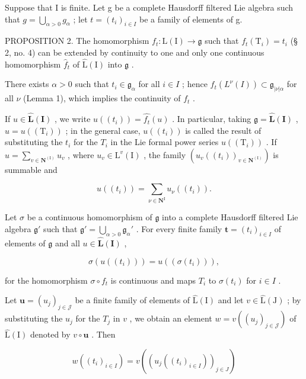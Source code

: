 Suppose that I is finite. Let g be a complete Hausdorff filtered Lie algebra such that \(g = \bigcup_{\alpha > 0} g_{\alpha}\) ; let \(t = (t_i)_{i \in I}\) be a family of elements of g.

PROPOSITION 2. The homomorphism \(f_{t} \colon \mathrm{L}(\mathrm{I}) \to \mathfrak{g}\) such that \(f_{t}(\mathrm{T}_{i}) = t_{i}\) (§ 2, no. 4) can be extended by continuity to one and only one continuous homomorphism \(\hat{f}_{t}\) of \(\hat{\mathrm{L}}(\mathrm{I})\) into \(\mathfrak{g}\) .

There exists \(\alpha > 0\) such that \(t_i \in \mathfrak{g}_\alpha\) for all \(i \in I\) ; hence \(f_t(L^\nu(I)) \subset \mathfrak{g}_{|\nu| \alpha}\) for all \(\nu\) (Lemma 1), which implies the continuity of \(f_t\) .

If \(u \in \widehat{\mathbf{L}}(\mathbf{I})\) , we write \(u((t_i)) = \widehat{f_t}(u)\) . In particular, taking \(\mathfrak{g} = \widehat{\mathbf{L}}(\mathbf{I})\) , \(u = u((\mathrm{T}_i))\) ; in the general case, \(u((t_i))\) is called the result of substituting the \(t_i\) for the \(T_i\) in the Lie formal power series \(u((\mathrm{T}_i))\) . If \(u = \sum_{v \in \mathbf{N}^{(\mathrm{I})}} u_v\) , where \(u_v \in \mathrm{L}^v(\mathrm{I})\) , the family \((u_v((t_i))_{v \in \mathbf{N}^{(\mathrm{I})}})\) is summable and

\[
u ((t _ {i})) = \sum_ {\nu \in \mathbf {N} ^ {\mathrm{I}}} u _ {\nu} ((t _ {i})).\tag{5}
\]

Let \(\sigma\) be a continuous homomorphism of \(\mathfrak{g}\) into a complete Hausdorff filtered Lie algebra \(\mathfrak{g}'\) such that \(\mathfrak{g}' = \bigcup_{\alpha > 0} \mathfrak{g}_{\alpha}'\) . For every finite family \(\boldsymbol{t} = (t_i)_{i \in I}\) of elements of \(\mathfrak{g}\) and all \(u \in \hat{\mathbf{L}}(\mathbf{I})\) ,

\[
\sigma (u ((t _ {i}))) = u ((\sigma (t _ {i}))),\tag{6}
\]

for the homomorphism \(\sigma \circ f_t\) is continuous and maps \(T_i\) to \(\sigma(t_i)\) for \(i \in I\) .

Let \(\boldsymbol{u} = (u_j)_{j \in \mathcal{J}}\) be a finite family of elements of \(\hat{\mathrm{L}}(\mathrm{I})\) and let \(v \in \hat{\mathrm{L}}(\mathrm{J})\) ; by substituting the \(u_j\) for the \(T_j\) in \(v\) , we obtain an element \(w = v((u_j)_{j \in \mathcal{J}})\) of \(\hat{\mathrm{L}}(\mathrm{I})\) denoted by \(v \circ \boldsymbol{u}\) . Then

\[
w ((t _ {i}) _ {i \in I}) = v ((u _ {j} ((t _ {i}) _ {i \in I})) _ {j \in J})\tag{7}
\]

